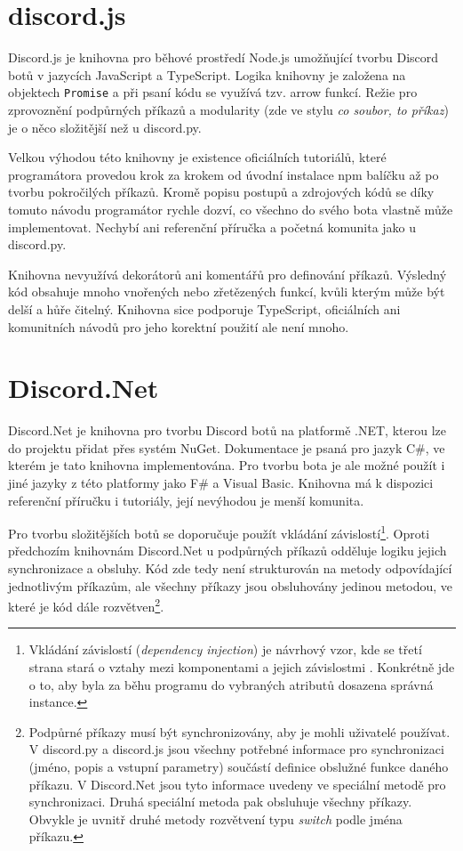 \documentclass[FM]{tulthesis}
\begin{document}
	\section{discord.js}
	
	Discord.js je knihovna pro běhové prostředí Node.js umožňující tvorbu Discord botů v jazycích JavaScript a TypeScript. Logika knihovny je založena na objektech \verb|Promise| a při psaní kódu se využívá tzv. arrow funkcí. Režie pro zprovoznění podpůrných příkazů a modularity (zde ve stylu \textit{co soubor, to příkaz}) je o něco složitější než u discord.py.
	
	Velkou výhodou této knihovny je existence oficiálních tutoriálů, které programátora provedou krok za krokem od úvodní instalace npm balíčku až po tvorbu pokročilých příkazů. Kromě popisu postupů a zdrojových kódů se díky tomuto návodu programátor rychle dozví, co všechno do svého bota vlastně může implementovat. Nechybí ani referenční příručka a početná komunita jako u discord.py.
	
	Knihovna nevyužívá dekorátorů ani komentářů pro definování příkazů. Výsledný kód obsahuje mnoho vnořených nebo zřetězených funkcí, kvůli kterým může být delší a hůře čitelný. Knihovna sice podporuje TypeScript, oficiálních ani komunitních návodů pro jeho korektní použití ale není mnoho.
	
	\section{Discord.Net}
	
	Discord.Net je knihovna pro tvorbu Discord botů na platformě .NET, kterou lze do projektu přidat přes systém NuGet. Dokumentace je psaná pro jazyk C\#, ve kterém je tato knihovna implementována. Pro tvorbu bota je ale možné použít i jiné jazyky z této platformy jako F\# a Visual Basic. Knihovna má k dispozici referenční příručku i tutoriály, její nevýhodou je menší komunita.
	
	 Pro tvorbu složitějších botů se doporučuje použít vkládání závislostí\footnote{Vkládání závislostí (\textit{dependency injection}) je návrhový vzor, kde se třetí strana stará o vztahy mezi komponentami a jejich závislostmi \cite{lit_distributedSystems}. Konkrétně jde o to, aby byla za běhu programu do vybraných atributů dosazena správná instance.}. Oproti předchozím knihovnám Discord.Net u podpůrných příkazů odděluje logiku jejich synchronizace a obsluhy. Kód zde tedy není strukturován na metody odpovídající jednotlivým příkazům, ale všechny příkazy jsou obsluhovány jedinou metodou, ve které je kód dále rozvětven\footnote{Podpůrné příkazy musí být synchronizovány, aby je mohli uživatelé používat. V discord.py a discord.js jsou všechny potřebné informace pro synchronizaci (jméno, popis a vstupní parametry) součástí definice obslužné funkce daného příkazu. V Discord.Net jsou tyto informace uvedeny ve speciální metodě pro synchronizaci. Druhá speciální metoda pak obsluhuje všechny příkazy. Obvykle je uvnitř druhé metody rozvětvení typu \textit{switch} podle jména příkazu.}.
	
\end{document}
